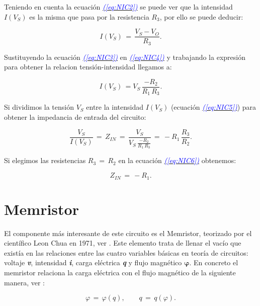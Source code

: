 \documentclass[12pt,a4paper]{report} %
\newcommand{\eref}[1]{\hyperref[#1]{\textcolor{blue}{\textit{(\ref*{#1})}}}}
\begin{document}
	Teniendo en cuenta la ecuación \eref{eq:NIC2} se puede ver que la intensidad $I(V_S)$ es la misma que pasa por la resistencia $R_3$, por ello se puede deducir:
	
	\begin{equation}
		I(V_S)\,=\,\frac{V_S - V_O}{R_3}.
		\label{eq:NIC4}
	\end{equation}\smallskip
	
	Sustituyendo la ecuación \eref{eq:NIC3} en \eref{eq:NIC4} y trabajando la expresión para obtener la relacion tensión-intensidad llegamos a:
	
	\begin{equation}
		I(V_S)\,=V_S\,\frac{-R_2}{R_1 \, R_3}.
		\label{eq:NIC5}
	\end{equation}\smallskip
	
	Si dividimos la tensión $V_S$ entre la intensidad $I(V_S)$ (ecuación \eref{eq:NIC5}) para obtener la impedancia de entrada del circuito:
	
	\begin{equation}
		\frac{V_S}{I(V_S)}\,=\,Z_{IN}\,=\,\frac{V_S}{V_S\,\frac{-R_2}{R_1 \, R_3}}\,=\,-R_1\,\frac{R_3}{R_2}.
		\label{eq:NIC6}
	\end{equation}\smallskip
	
	Si elegimos las resistencias $R_3\,=\,R_2$ en la ecuación \eref{eq:NIC6} obtenemos:
	
	\begin{equation}
		Z_{IN}\,=\,-R_1.
		\label{eq:NIC7}
	\end{equation}\smallskip
	
	\newpage
	\section{Memristor}
	\noindent El componente más interesante de este circuito es el Memristor, teorizado por el científico Leon Chua en 1971, ver \cite{chuamissing1971}. Este elemento trata de llenar el vacío que existía en las relaciones entre las cuatro variables básicas en teoría de circuitos: voltaje \textbf{\textit{v}}, intensidad \textbf{\textit{i}}, carga eléctrica \textbf{\textit{q}} y flujo magnético \textit{$\bm{\varphi}$}. En concreto el memristor relaciona la carga eléctrica con el flujo magnético de la siguiente manera, ver \cite{chuaoscillator2008}:
	
	\begin{equation}
		\varphi\,=\,\varphi(q), \qquad q\,=\,q(\varphi).
		\label{eq:flujocarga}
	\end{equation}\smallskip
	
\end{document}
